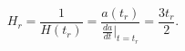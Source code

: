 \begin{equation}
H_r=\frac{1}{H(t_r)}=\frac{a(t_r)}{\frac{da}{dt}|_{t=t_r}}
=\frac{3t_r}{2}.
\end{equation}

